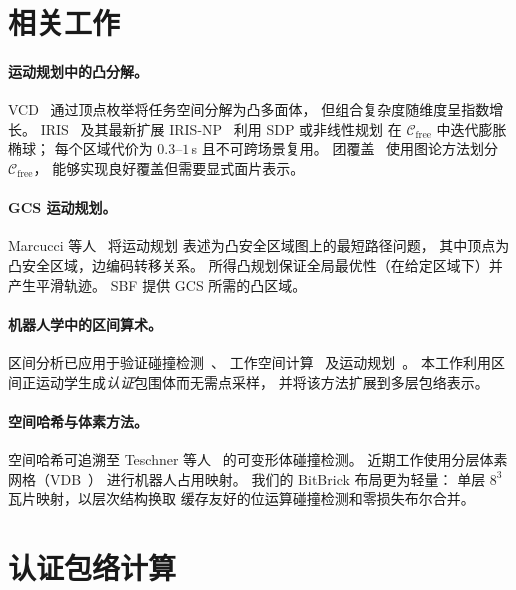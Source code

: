 \documentclass[journal]{IEEEtran}
\newcommand{\Cfree}{\mathcal{C}_\text{free}}
\begin{document}
\section{相关工作}\label{sec:related}

\paragraph{运动规划中的凸分解。}
VCD~\cite{werner2024vcd} 通过顶点枚举将任务空间分解为凸多面体，
但组合复杂度随维度呈指数增长。
IRIS~\cite{deits2015computing} 及其最新扩展
IRIS-NP~\cite{werner2024fast} 利用 SDP 或非线性规划
在 $\Cfree$ 中迭代膨胀椭球；
每个区域代价为 $0.3$--$1$\,s 且不可跨场景复用。
团覆盖~\cite{amice2024clique} 使用图论方法划分 $\Cfree$，
能够实现良好覆盖但需要显式面片表示。

\paragraph{GCS 运动规划。}
Marcucci 等人~\cite{marcucci2024motion} 将运动规划
表述为凸安全区域图上的最短路径问题，
其中顶点为凸安全区域，边编码转移关系。
所得凸规划保证全局最优性（在给定区域下）并产生平滑轨迹。
SBF 提供 GCS 所需的凸区域。

\paragraph{机器人学中的区间算术。}
区间分析已应用于验证碰撞检测~\cite{merlet2004solving}、
工作空间计算~\cite{merlet2006interval}
及运动规划~\cite{jaulin2001applied}。
本工作利用区间正运动学生成\emph{认证}包围体而无需点采样，
并将该方法扩展到多层包络表示。

\paragraph{空间哈希与体素方法。}
空间哈希可追溯至 Teschner 等人~\cite{teschner2003optimized}
的可变形体碰撞检测。
近期工作使用分层体素网格（VDB~\cite{museth2013vdb}）
进行机器人占用映射。
我们的 BitBrick 布局更为轻量：
单层 $8^3$ 瓦片映射，以层次结构换取
缓存友好的位运算碰撞检测和零损失布尔合并。

\section{认证包络计算}\label{sec:envelope}
\end{document}

